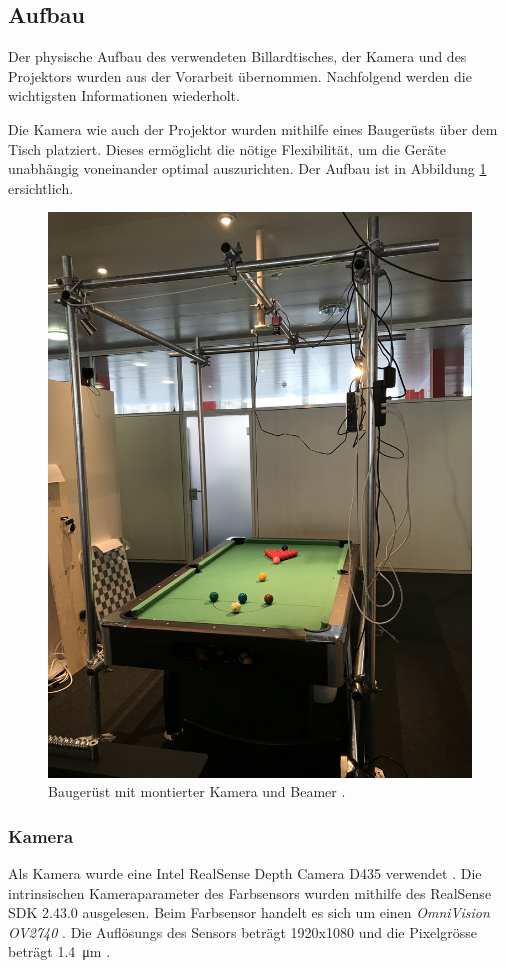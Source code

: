 \subsection{Aufbau}
Der physische Aufbau des verwendeten Billardtisches, der Kamera und des Projektors wurden aus der Vorarbeit \cite{project2:aufbau} übernommen.
Nachfolgend werden die wichtigsten Informationen wiederholt.

Die Kamera wie auch der Projektor wurden mithilfe eines Baugerüsts über dem Tisch platziert.
Dieses ermöglicht die nötige Flexibilität, um die Geräte unabhängig voneinander optimal auszurichten.
Der Aufbau ist in Abbildung \ref{fig:construction} ersichtlich.

\begin{figure}[h!]
    \begin{center}
        \includegraphics[width=0.6\linewidth]{../common/03_billiard_ai/resources/table.jpg}
    \end{center}
    \caption{Baugerüst mit montierter Kamera und Beamer \cite{project2:aufbau}.}
    \label{fig:construction}
\end{figure}

\subsubsection{Kamera}\label{kap:camera}

Als Kamera wurde eine Intel RealSense Depth Camera D435 verwendet \cite{intel:realsense_d435}.
Die intrinsischen Kameraparameter des Farbsensors wurden mithilfe des RealSense SDK 2.43.0 \cite{github:realsense_sdk} ausgelesen.
Beim Farbsensor handelt es sich um einen \emph{OmniVision OV2740} \cite{intel:realsense_d435_datasheet}.
Die Auflösungs des Sensors beträgt 1920x1080 und die Pixelgrösse beträgt \SI{1.4}{\micro\metre} \cite{omnivision:ov2740}.

